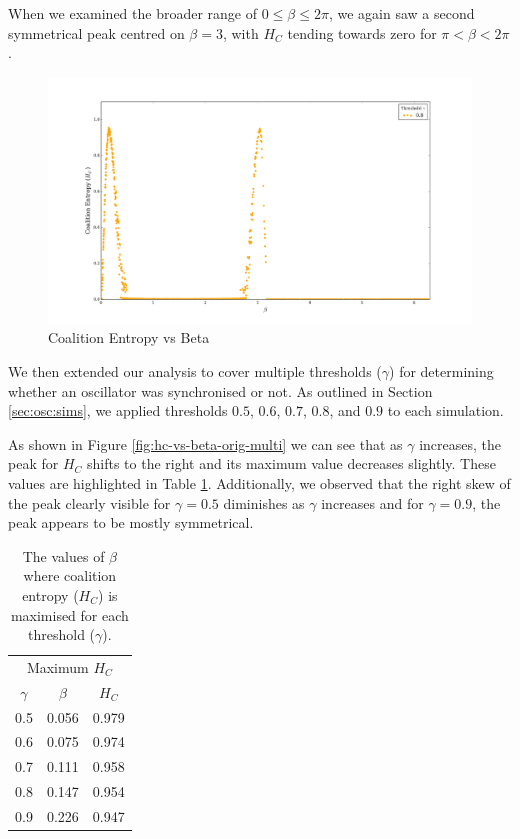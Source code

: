 \documentclass[a4paper,11pt]{article}
\begin{document}
When we examined the broader range of $0 \leq \beta \leq 2\pi$, we again saw a second symmetrical peak centred on $\beta = 3$, with $H_C$ tending towards zero for $\pi < \beta< 2\pi$.

\begin{figure}[H]
\begin{center}
\includegraphics[scale = 0.35]{figures/hc_vs_beta_ext}
\caption{
	Coalition Entropy vs Beta
	\label{fig:hc-vs-beta-ext}
}
\end{center}
\end{figure}

We then extended our analysis to cover multiple thresholds ($\gamma$) for determining whether an oscillator was synchronised or not. As outlined in Section \ref{sec:osc:sims}, we applied thresholds $0.5$, $0.6$, $0.7$, $0.8$, and $0.9$ to each simulation.

As shown in Figure \ref{fig:hc-vs-beta-orig-multi} we can see that as $\gamma$ increases, the peak for $H_C$ shifts to the right and its maximum value decreases slightly. These values are highlighted in Table \ref{tab:max-hc-beta}. Additionally, we observed that the right skew of the peak clearly visible for $\gamma = 0.5$ diminishes as $\gamma$ increases and for $\gamma = 0.9$, the peak appears to be mostly symmetrical.

\begin{table}[ht]
\centering
\begin{tabular}{ c | c c }
\multicolumn{3}{c}{Maximum $H_C$} \\ [2mm]
$\gamma$ & $\beta$ & $H_C$\\
\hline
0.5 & 0.056 & 0.979 \\
0.6 & 0.075 & 0.974 \\
0.7 & 0.111 & 0.958 \\
0.8 & 0.147 & 0.954 \\
0.9 & 0.226 & 0.947 \\
\end{tabular}
\caption{
	The values of $\beta$ where coalition entropy ($H_C$) is maximised for each threshold ($\gamma$).
	\label{tab:max-hc-beta}
}
\end{table}
\end{document}
